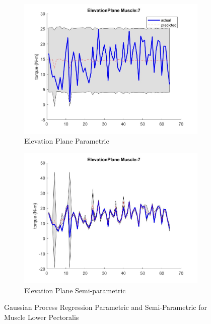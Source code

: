 \begin{figure}[htbp]
    \begin{subfigure}[b]{0.45\linewidth}
        \includegraphics[height=0.15\textheight]{Pictures/Results/GPR/ElevationPlane_7Parametric.jpg}
        \caption{Elevation Plane Parametric}
    \end{subfigure}
    \hfill
    \begin{subfigure}[b]{0.45\linewidth}
        \includegraphics[height=0.15\textheight]{Pictures/Results/GPR/ElevationPlane_7Semiparametric.jpg}
        \caption{Elevation Plane Semi-parametric}
    \end{subfigure}
    
    \caption{Gaussian Process Regression Parametric and Semi-Parametric for Muscle Lower Pectoralis}
    \label{fig:GPRMuscleLowerPectoralis}
\end{figure}


